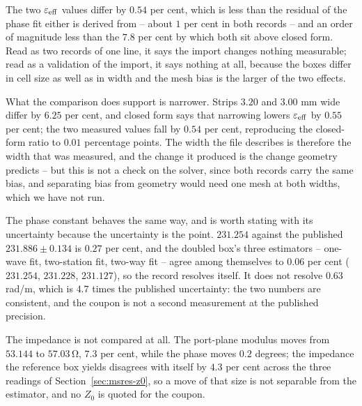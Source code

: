 The two $\varepsilon_{\mathrm{eff}}$ values differ by $0.54$ per cent, which is less than the residual of the phase fit
either is derived from -- about $1$ per cent in both records -- and an order of magnitude less than the $7.8$ per
cent by which both sit above closed form. Read as two records of one line, it says the import changes nothing
measurable; read as a validation of the import, it says nothing at all, because the boxes differ in cell size as
well as in width and the mesh bias is the larger of the two effects.

What the comparison does support is narrower. Strips $3.20$ and $3.00$ mm wide differ by $6.25$ per cent, and
closed form says that narrowing lowers $\varepsilon_{\mathrm{eff}}$ by $0.55$ per cent; the two measured values fall by
$0.54$ per cent, reproducing the closed-form ratio to $0.01$ percentage points. The width the file describes is
therefore the width that was measured, and the change it produced is the change geometry predicts -- but this is
not a check on the solver, since both records carry the same bias, and separating bias from geometry would need
one mesh at both widths, which we have not run.

The phase constant behaves the same way, and is worth stating with its uncertainty because the uncertainty is the
point. $231.254$ against the published $231.886 \pm 0.134$ is $0.27$ per cent, and the doubled box's three
estimators -- one-wave fit, two-station fit, two-way fit -- agree among themselves to $0.06$ per cent ($231.254$,
$231.228$, $231.127$), so the record resolves itself. It does not resolve $0.63$ rad/m, which is $4.7$ times the
published uncertainty: the two numbers are consistent, and the coupon is not a second measurement at the
published precision.

The impedance is not compared at all. The port-plane modulus moves from $53.144$ to $57.03\,\si{\ohm}$, $7.3$ per
cent, while the phase moves $0.2$ degrees; the impedance the reference box yields disagrees with itself by $4.3$
per cent across the three readings of Section~\ref{sec:msres-z0}, so a move of that size is not separable from
the estimator, and no $Z_0$ is quoted for the coupon.

